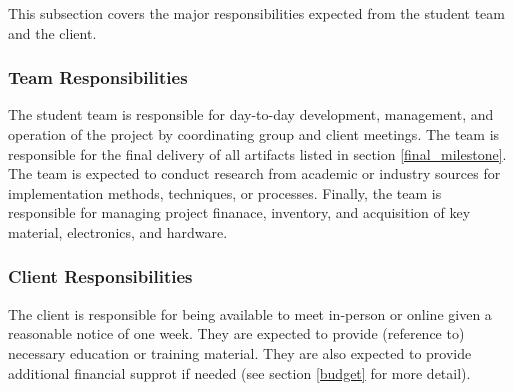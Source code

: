 This subsection covers the major responsibilities expected from the 
student team and the client.

\subsubsection{Team Responsibilities}
The student team is responsible for day-to-day development, management, and
operation of the project by coordinating group and client meetings. The
team is responsible for the final delivery of all artifacts listed in section
\ref{final_milestone}.
The team is expected to conduct research from academic or industry sources
for implementation methods, techniques, or processes.
Finally, the team is responsible for managing project finanace, inventory,
and acquisition of key material, electronics, and hardware.

\subsubsection{Client Responsibilities}
The client is responsible for being available to meet in-person or online
given a reasonable notice of one week. They are expected to provide
(reference to) necessary education or training material. They are also expected
to provide additional financial supprot if needed (see section \ref{budget} for
more detail).